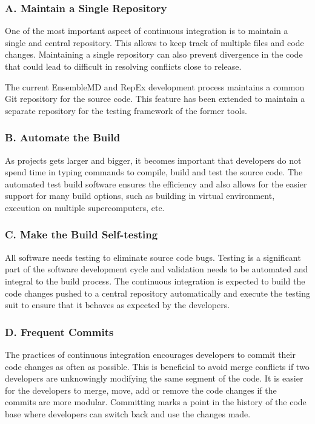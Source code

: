 \documentclass[10pt]{ruthesis}
\begin{document}
\subsubsection{\textbf{A. Maintain a Single Repository}}
One of the most important aspect of continuous integration is to maintain a single and central repository. This allows to keep track of multiple files and code changes. Maintaining a single repository can also prevent divergence in the code that could lead to difficult in resolving conflicts close to release. 

The current EnsembleMD and RepEx development process maintains a common Git repository for the source code. This feature has been extended to maintain a separate repository for the testing framework of the former tools.

\subsubsection{\textbf{B. Automate the Build}}
As projects gets larger and bigger, it becomes important that developers do not spend time in typing commands to compile, build and test the source code. The automated test build software ensures the efficiency and also allows for the easier support for many build options, such as building in virtual environment, execution on multiple supercomputers, etc.

\subsubsection{\textbf{C. Make the Build Self-testing}}
All software needs testing to eliminate source code bugs. Testing is a significant part of the software development cycle and validation needs to be automated and integral to the build process. The continuous integration is expected to build the code changes pushed to a central repository automatically and execute the testing suit to ensure that it behaves as expected by the developers. 

\subsubsection{\textbf{D. Frequent Commits}}
The practices of continuous integration encourages developers to commit their code changes as often as possible. This is beneficial to avoid merge conflicts if two developers are unknowingly modifying the same segment of the code. It is easier for the developers to merge, move, add or remove the code changes if the commits are more modular. Committing marks a point in the history of the code base where developers can switch back and use the changes made.
\end{document}
